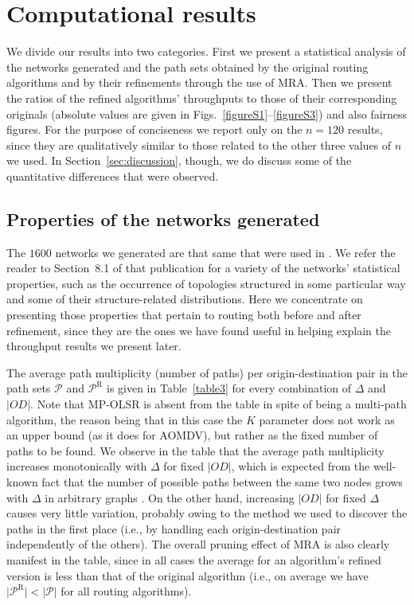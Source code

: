\documentclass{article}
\begin{document}
\section{Computational results}\label{sec:results}

We divide our results into two categories. First we present a statistical
analysis of the networks generated and the path sets obtained by the original
routing algorithms and by their refinements through the use of MRA. Then we
present the ratios of the refined algorithms' throughputs to those of their
corresponding originals (absolute values are given in
Figs.~\ref{figureS1}--\ref{figureS3}) and also fairness figures. For the purpose
of conciseness we report only on the $n=120$ results, since they are
qualitatively similar to those related to the other three values of $n$ we used.
In Section~\ref{sec:discussion}, though, we do discuss some of the quantitative
differences that were observed.

\subsection{Properties of the networks generated}

The $1600$ networks we generated are that same that were used in
\cite{Fabio2012}. We refer the reader to Section~8.1 of that publication for a
variety of the networks' statistical properties, such as the occurrence of
topologies structured in some particular way and some of their
structure-related distributions. Here we concentrate on presenting those
properties that pertain to routing both before and after refinement, since they
are the ones we have found useful in helping explain the throughput results we
present later.

The average path multiplicity (number of paths) per origin-destination pair in
the path sets $\mathcal{P}$ and $\mathcal{P}^\mathrm{R}$ is given in
Table~\ref{table3} for every combination of $\Delta$ and $\vert OD\vert$.
Note that MP-OLSR is absent from the table in spite of being a multi-path
algorithm, the reason being that in this case the $K$ parameter does not work
as an upper bound (as it does for AOMDV), but rather as the fixed number of
paths to be found. We observe in the table that the average path multiplicity
increases monotonically with $\Delta$ for fixed $\vert OD\vert$, which is
expected from the well-known fact that the number of possible paths between the
same two nodes grows with $\Delta$ in arbitrary graphs \cite{Hoffman1963}. On
the other hand, increasing $\vert OD\vert$ for fixed $\Delta$ causes very little
variation, probably owing to the method we used to discover the paths in the
first place (i.e., by handling each origin-destination pair independently of the
others). The overall pruning effect of MRA is also clearly manifest in the
table, since in all cases the average for an algorithm's refined version is less
than that of the original algorithm (i.e., on average we have
$\vert\mathcal{P}^\mathrm{R}\vert<\vert\mathcal{P}\vert$ for all routing
algorithms).
\end{document}
